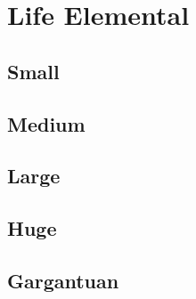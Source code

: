 \section{Life Elemental}

\subsection{Small}

\subsection{Medium}

\subsection{Large}

\subsection{Huge}

\subsection{Gargantuan}